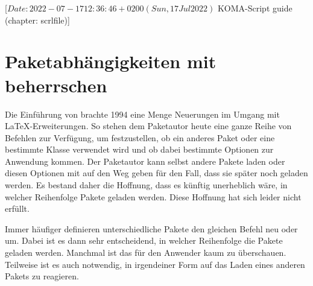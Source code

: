 %
%
%
%
%
%
%

%
                 [$Date: 2022-07-17 12:36:46 +0200 (Sun, 17 Jul 2022) $
                  KOMA-Script guide (chapter: scrlfile)]

\chapter{Paketabhängigkeiten mit  
  beherrschen}

\BeginIndexGroup
{}

Die Einführung von \LaTeXe{} brachte 1994 eine Menge Neuerungen im Umgang mit
\LaTeX-Erweiterungen. So stehen dem Paketautor heute eine ganze Reihe von
Befehlen zur Verfügung, um festzustellen, ob ein anderes Paket oder eine
bestimmte Klasse verwendet wird und ob dabei bestimmte Optionen zur Anwendung
kommen. Der Paketautor kann selbst andere Pakete laden oder diesen Optionen
mit auf den Weg geben für den Fall, dass sie später noch geladen werden. Es
bestand daher die Hoffnung, dass es künftig unerheblich wäre, in welcher
Reihenfolge Pakete geladen werden. Diese Hoffnung hat sich leider nicht
erfüllt.

Immer häufiger definieren unterschiedliche Pakete den
gleichen Befehl neu oder um. Dabei ist es dann sehr entscheidend, in welcher
Reihenfolge die Pakete geladen werden. Manchmal ist das für den Anwender kaum
zu überschauen. Teilweise ist es auch notwendig, in irgendeiner Form auf das
Laden eines anderen Pakets zu reagieren.

